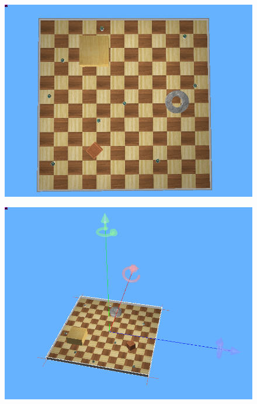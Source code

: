 \begin{figure}[!h]
	\centering
	\begin{minipage}{.45\textwidth}
		\centering
\includegraphics[width=1\linewidth]{top-down-simulation}
\label{fig:arena}
	\end{minipage}
	\begin{minipage}{.45\textwidth}
	\centering
\includegraphics[width=1\linewidth]{sideways}
\label{fig:axes}
	\end{minipage}
\end{figure}


